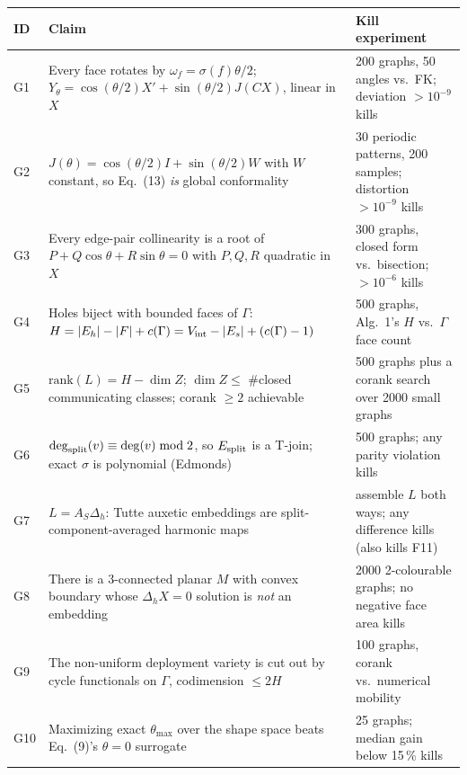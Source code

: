 \documentclass[10pt,a4paper]{article}
\begin{document}
\begin{table}[h]\centering\small
\begin{tabular}{@{}lp{78mm}p{56mm}@{}}
\toprule
ID & Claim & Kill experiment \\
\midrule
G1 & Every face rotates by $\omega_f = \sigma(f)\theta/2$; $Y_\theta = \cos(\theta/2)X' + \sin(\theta/2)J(CX)$, linear in $X$ & 200 graphs, 50 angles vs.\ FK; deviation $>10^{-9}$ kills \\
G2 & $J(\theta) = \cos(\theta/2)I + \sin(\theta/2)W$ with $W$ constant, so Eq.~(13) \emph{is} global conformality & 30 periodic patterns, 200 samples; distortion $>10^{-9}$ kills \\
G3 & Every edge-pair collinearity is a root of $P + Q\cos\theta + R\sin\theta = 0$ with $P,Q,R$ quadratic in $X$ & 300 graphs, closed form vs.\ bisection; $>10^{-6}$ kills \\
G4 & Holes biject with bounded faces of $\Gamma$: $H = |E_h| - |F| + c(\Gamma) = V_{\rm int} - |E_s| + (c(\Gamma)-1)$ & 500 graphs, Alg.~1's $H$ vs.\ $\Gamma$ face count \\
G5 & $\mathrm{rank}(L) = H - \dim Z$; $\dim Z \le$ \#closed communicating classes; corank $\ge 2$ achievable & 500 graphs plus a corank search over 2000 small graphs \\
G6 & $\deg_{\rm split}(v)\equiv\deg(v)\bmod 2$, so $E_{\rm split}$ is a T-join; exact $\sigma$ is polynomial (Edmonds) & 500 graphs; any parity violation kills \\
G7 & $L = A_S\Delta_h$: Tutte auxetic embeddings are split-component-averaged harmonic maps & assemble $L$ both ways; any difference kills (also kills F11) \\
G8 & There is a 3-connected planar $M$ with convex boundary whose $\Delta_h X = 0$ solution is \emph{not} an embedding & 2000 2-colourable graphs; no negative face area kills \\
G9 & The non-uniform deployment variety is cut out by cycle functionals on $\Gamma$, codimension $\le 2H$ & 100 graphs, corank vs.\ numerical mobility \\
G10 & Maximizing exact $\theta_{\max}$ over the shape space beats Eq.~(9)'s $\theta=0$ surrogate & 25 graphs; median gain below 15\,\% kills \\
\bottomrule
\end{tabular}
\end{table}
\end{document}
